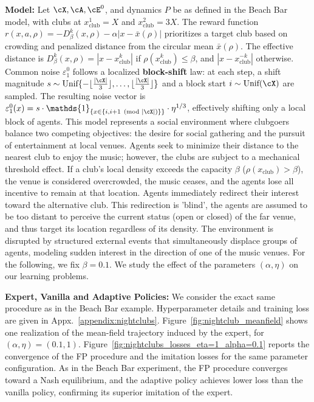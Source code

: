 \documentclass{article}
\theoremstyle{plain}
\begin{document}
\noindent\textbf{Model:}
Let $\cX, \cA, \cE^0$, and dynamics $P$ be as defined in the Beach Bar model, with clubs at $x^1_{\text{club}}=X$ and $x^2_{\text{club}}=3X$. The reward function $r(x, a, \rho) = -D_{\beta}^k(x, \rho) - \alpha |x - \bar{x}(\rho)|$ prioritizes a target club based on crowding and penalized distance from the circular mean $\bar{x}(\rho)$. The effective distance is $D_{\beta}^k(x, \rho) = |x - x^k_{\text{club}}|$ if $\rho(x^k_{\text{club}}) \le \beta$, and $|x - x^{-k}_{\text{club}}|$ otherwise.
Common noise $\varepsilon^0_1$ follows a localized \textbf{block-shift} law: at each step, a shift magnitude $s \sim \text{Unif}\{-\lfloor \frac{|\cX|}{3} \rfloor, \dots, \lfloor \frac{|\cX|}{3} \rfloor\}$ and a block start $i \sim \text{Unif}(\cX)$ are sampled. The resulting noise vector is $\varepsilon^0_1(x) = s \cdot \mathds{1}_{\{x \in \{i, i+1 \pmod{|\cX|}\}\}} \cdot \eta^{1/3}$, effectively shifting only a local block of agents. This model represents a social environment where clubgoers balance two competing objectives: the desire for social gathering and the pursuit of entertainment at local venues. Agents seek to minimize their distance to the nearest club to enjoy the music; however, the clubs are subject to a mechanical threshold effect. If a club's local density exceeds the capacity $\beta$ ($\rho(x_{\text{club}}) > \beta$), the venue is considered overcrowded, the music ceases, and the agents lose all incentive to remain at that location. Agents immediately redirect their interest toward the alternative club. This redirection is 'blind', the agents are assumed to be too distant to perceive the current status (open or closed) of the far venue, and thus target its location regardless of its density. The environment is disrupted by structured external events that simultaneously displace groups of agents, modeling sudden interest in the direction of one of the music venues.
For the following, we fix $\beta = 0.1$. We study the effect of the parameters $(\alpha, \eta)$ on our learning problems. 

\noindent\textbf{Expert, Vanilla and Adaptive Policies:}
We consider the exact same procedure as in the Beach Bar example. Hyperparameter details and training loss are given in Appx.~\ref{appendix:nightclubs}. Figure~\ref{fig:nightclub_meanfield} shows one realization of the mean-field trajectory induced by the expert, for $(\alpha, \eta) = (0.1, 1)$. Figure~\ref{fig:nightclubs_losses_eta=1_alpha=0.1} reports the convergence of the FP procedure and the imitation losses for the same parameter configuration. As in the Beach Bar experiment, the FP procedure converges toward a Nash equilibrium, and the adaptive policy achieves lower loss than the vanilla policy, confirming its superior imitation of the expert.
\end{document}
